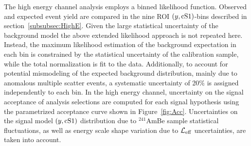 The high energy channel analysis employs a binned likelihood function. Observed and expected event yield are compared in the nine ROI $(y,\mathrm{cS1}{})$-bins described in section~\ref{subsubsec:HighE}. 
Given the large statistical uncertainty of the background model the above extended likelihood approach is not repeated here.
Instead, the maximum likelihood estimation of the background expectation in each bin is constrained by the statistical uncertainty of the calibration sample, while the total 
normalization is fit to the data. Additionally, to account for potential mismodeling of the expected background distribution, mainly due to anomalous multiple scatter events,
a systematic uncertainty of 20\% is assigned independently to each bin. In the high energy channel, uncertainty on the signal acceptance of analysis selections are computed for each signal hypothesis using the parametrized acceptance curve shown in Figure~\ref{fig:Acc}.
Uncertainties on the signal model $(y,\mathrm{cS1}{})$ distribution due to $^{241}$AmBe sample statistical fluctuations, as well as energy scale shape variation due to $\mathcal{L}_{\mathrm{eff}}$ uncertainties, are taken into account.



